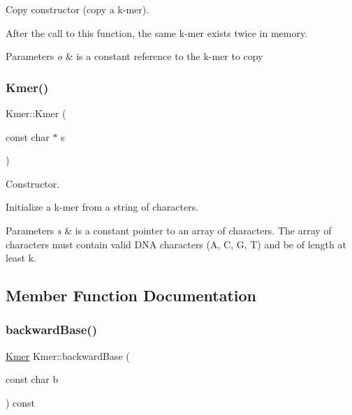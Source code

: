 Copy constructor (copy a k-\/mer). 

After the call to this function, the same k-\/mer exists twice in memory. 
\begin{DoxyParams}{Parameters}
{\em o} & is a constant reference to the k-\/mer to copy \\
\hline
\end{DoxyParams}
\mbox{\label{classKmer_a1fb825d0a9444de791c5bba652d69f1d}} 
\subsubsection{\texorpdfstring{Kmer()}{Kmer()}\hspace{0.1cm}{\footnotesize\ttfamily [2/2]}}
{\footnotesize\ttfamily Kmer\+::\+Kmer (\begin{DoxyParamCaption}\item[{const char $\ast$}]{s }\end{DoxyParamCaption})\hspace{0.3cm}{\ttfamily [explicit]}}



Constructor. 

Initialize a k-\/mer from a string of characters. 
\begin{DoxyParams}{Parameters}
{\em s} & is a constant pointer to an array of characters. The array of characters must contain valid D\+NA characters (\textquotesingle{}A\textquotesingle{}, \textquotesingle{}C\textquotesingle{}, \textquotesingle{}G\textquotesingle{}, \textquotesingle{}T\textquotesingle{}) and be of length at least k. \\
\hline
\end{DoxyParams}


\subsection{Member Function Documentation}
\mbox{\label{classKmer_a7670003b3027c3401454dc700ca5b3c5}} 
\subsubsection{\texorpdfstring{backward\+Base()}{backwardBase()}}
{\footnotesize\ttfamily \hyperlink{classKmer}{Kmer} Kmer\+::backward\+Base (\begin{DoxyParamCaption}\item[{const char}]{b }\end{DoxyParamCaption}) const}



